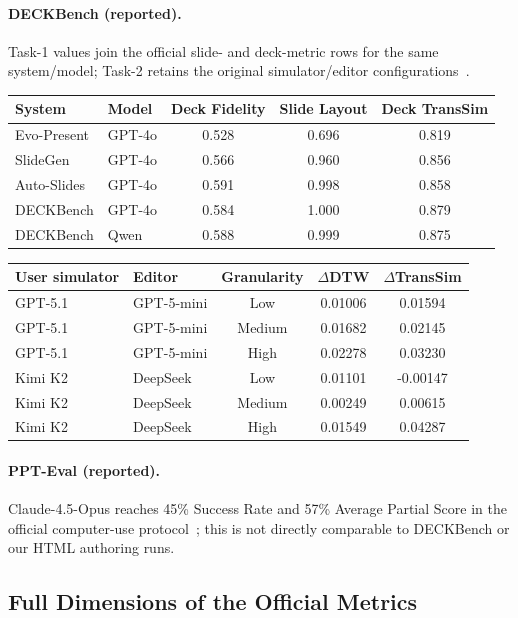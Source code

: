 \paragraph{DECKBench (reported).} Task-1 values join the official slide- and deck-metric rows for the same
system/model; Task-2 retains the original simulator/editor configurations~\citep{jang2026deckbench}.
\begin{center}\small
\begin{tabular}{llccc}
\toprule System & Model & Deck Fidelity & Slide Layout & Deck TransSim \\
\midrule
Evo-Present & GPT-4o & 0.528 & 0.696 & 0.819 \\
SlideGen & GPT-4o & 0.566 & 0.960 & 0.856 \\
Auto-Slides & GPT-4o & 0.591 & 0.998 & 0.858 \\
DECKBench & GPT-4o & 0.584 & 1.000 & 0.879 \\
DECKBench & Qwen & 0.588 & 0.999 & 0.875 \\
\bottomrule
\end{tabular}
\end{center}
\begin{center}\small
\begin{tabular}{llccc}
\toprule User simulator & Editor & Granularity & $\Delta$DTW & $\Delta$TransSim \\
\midrule
GPT-5.1 & GPT-5-mini & Low & 0.01006 & 0.01594 \\
GPT-5.1 & GPT-5-mini & Medium & 0.01682 & 0.02145 \\
GPT-5.1 & GPT-5-mini & High & 0.02278 & 0.03230 \\
Kimi K2 & DeepSeek & Low & 0.01101 & -0.00147 \\
Kimi K2 & DeepSeek & Medium & 0.00249 & 0.00615 \\
Kimi K2 & DeepSeek & High & 0.01549 & 0.04287 \\
\bottomrule
\end{tabular}
\end{center}

\paragraph{PPT-Eval (reported).} Claude-4.5-Opus reaches 45\% Success Rate and 57\% Average Partial
Score in the official computer-use protocol~\citep{gandhi2026ppteval}; this is not directly comparable
to DECKBench or our HTML authoring runs.

\subsection{Full Dimensions of the Official Metrics}

